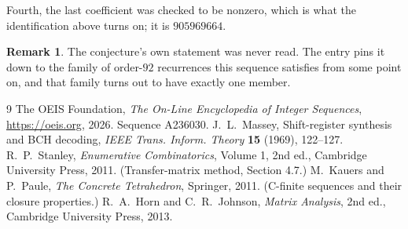 \documentclass[11pt,a4paper]{article}
\theoremstyle{plain}
\theoremstyle{definition}
\newtheorem{remark}[theorem]{Remark}
\begin{document}
Fourth, the last coefficient was checked to be nonzero, which is what the identification above
turns on; it is $905969664$.

\begin{remark}
The conjecture's own statement was never read. The entry pins it down to the family of
order-$92$ recurrences this sequence satisfies from some point on, and that family turns
out to have exactly one member.
\end{remark}

\begin{thebibliography}{9}
 The OEIS Foundation, \emph{The On-Line Encyclopedia of Integer
Sequences}, \url{https://oeis.org}, 2026. Sequence A236030.
 J.~L.~Massey, Shift-register synthesis and BCH decoding, \emph{IEEE
Trans. Inform. Theory} \textbf{15} (1969), 122--127.
 R.~P.~Stanley, \emph{Enumerative Combinatorics}, Volume 1, 2nd ed.,
Cambridge University Press, 2011. (Transfer-matrix method, Section 4.7.)
 M.~Kauers and P.~Paule, \emph{The Concrete Tetrahedron}, Springer, 2011.
(C-finite sequences and their closure properties.)
 R.~A.~Horn and C.~R.~Johnson, \emph{Matrix Analysis}, 2nd ed., Cambridge
University Press, 2013.
\end{thebibliography}
\end{document}
